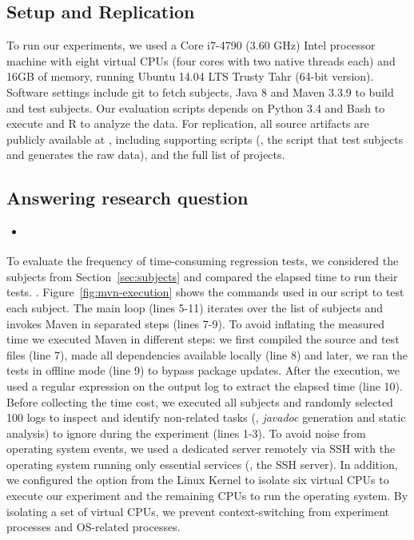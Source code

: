 \subsection{Setup and Replication}
\label{sec:setup}

To run our experiments, we used a Core i7-4790 (3.60 GHz) Intel
processor machine with eight virtual CPUs (four cores with two native
threads each) and 16GB of memory, running Ubuntu 14.04 LTS Trusty Tahr
(64-bit version). Software settings include git to fetch subjects,
Java 8 and Maven 3.3.9 to build and test subjects. Our evaluation
scripts depends on Python 3.4 and Bash to execute and R to analyze the
data. For replication, all source artifacts are publicly available at
, including supporting scripts (\eg, the script
that test subjects and generates the raw data), and the full list of
projects. 

\subsection{Answering research question \numRQA{}}
\label{sec:rqA}

\begin{itemize}
    \item \emph{\RQA}
\end{itemize}

To evaluate the frequency of time-consuming regression tests, we
considered the \numSubjs{} subjects from Section~\ref{sec:subjects}
and compared the elapsed time to run their tests. .  Figure~\ref{fig:mvn-execution} shows the
commands used in our script to test each subject. The main loop (lines
5-11) iterates over the list of subjects and invokes Maven in
separated steps (lines 7-9). To avoid inflating the measured time we
executed Maven in different steps: we first compiled the source and
test files (line 7), made all dependencies available locally (line 8)
and later, we ran the tests in offline mode (line 9) to bypass package
updates. After the execution, we used a regular expression on the
output log to extract the elapsed time (line 10). Before collecting
the time cost, we executed all subjects and randomly selected 100 logs
to inspect and identify non-related tasks (\eg, \emph{javadoc}
generation and static analysis) to ignore during the experiment (lines
1-3).  To avoid noise from operating system events, we used a
dedicated server remotely via SSH with the operating system running
only essential services (\eg, the SSH server). In addition, we
configured the  option from the Linux Kernel
\cite{linux-kernel} to isolate six virtual CPUs to execute our
experiment and the remaining CPUs to run the operating system. By
isolating a set of virtual CPUs, we prevent context-switching from
experiment processes and OS-related processes.

